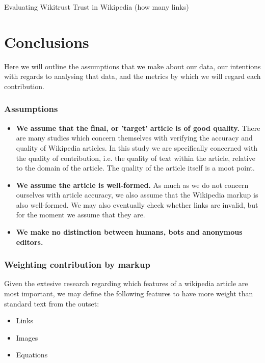 \documentclass[a4paper,11pt,twoside,notitlepage]{article}
\begin{document}
       \cite{Lucassen2011} Evaluating Wikitrust
       \cite{Lucassen2010} Trust in Wikipedia (how many links)
       


        \section{Conclusions}
        Here we will outline the assumptions that we make about our
        data, our intentions with regards to analysing that data, and
        the metrics by which we will regard each contribution.

        \subsubsection*{Assumptions}
        \begin{itemize}
          \item \textbf{We assume that the final, or 'target' article
            is of good quality.} There are many studies which concern
            themselves with verifying the accuracy and quality of
            Wikipedia articles. In this study we are specifically
            concerned with the quality of contribution, i.e. the
            quality of text within the article, relative to the domain
            of the article. The quality of the article itself is a
            moot point.
          \item \textbf{We assume the article is well-formed.} As much
            as we do not concern ourselves with article accuracy, we
            also assume that the Wikipedia markup is also
            well-formed. We may also eventually check whether links
            are invalid, but for the moment we assume that they are.
          \item \textbf{We make no distinction between humans, bots
            and anonymous editors.}
        \end{itemize}
        
        \subsubsection*{Weighting contribution by markup}
        Given the extesive research regarding which features of a
        wikipedia article are most important, we may define the
        following features to have more weight than standard text from
        the outset:
        \begin{itemize}
          \item Links
          \item Images
          \item Equations
        \end{itemize}
\end{document}
